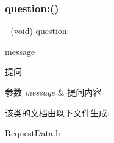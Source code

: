 \subsubsection{\texorpdfstring{question\+:()}{question:()}}
{\footnotesize\ttfamily -\/ (void) question\+: \begin{DoxyParamCaption}\item[{(N\+S\+String $\ast$)}]{message }\end{DoxyParamCaption}}



提问 


\begin{DoxyParams}{参数}
{\em message} & 提问内容 \\
\hline
\end{DoxyParams}


该类的文档由以下文件生成\+:\begin{DoxyCompactItemize}
\item 
Request\+Data.\+h\end{DoxyCompactItemize}

